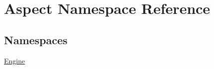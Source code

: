 \hypertarget{namespace_aspect}{}\section{Aspect Namespace Reference}
\label{namespace_aspect}
\subsection*{Namespaces}
\begin{DoxyCompactItemize}
\item 
 \mbox{\hyperlink{namespace_aspect_1_1_engine}{Engine}}
\end{DoxyCompactItemize}
